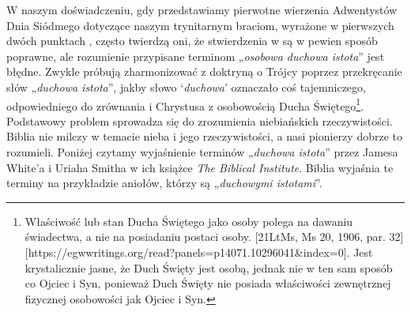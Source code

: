 W naszym doświadczeniu, gdy przedstawiamy pierwotne wierzenia Adwentystów Dnia Siódmego dotyczące  naszym trynitarnym braciom, wyrażone w pierwszych dwóch punktach , często twierdzą oni, że stwierdzenia w  są w pewien sposób poprawne, ale rozumienie przypisane terminom „\textit{osobowa duchowa istota}” jest błędne. Zwykle próbują zharmonizować  z doktryną o Trójcy poprzez przekręcanie słów „\textit{duchowa istota}”, jakby słowo ‘\textit{duchowa}’ oznaczało coś tajemniczego, odpowiedniego do zrównania  i Chrystusa z osobowością Ducha Świętego\footnote{Właściwość lub stan Ducha Świętego jako osoby polega na dawaniu świadectwa, a nie na posiadaniu postaci osoby. [21LtMs, Ms 20, 1906, par. 32][https://egwwritings.org/read?panels=p14071.10296041&index=0]. Jest krystalicznie jasne, że Duch Święty jest osobą, jednak nie w ten sam sposób co Ojciec i Syn, ponieważ Duch Święty nie posiada właściwości zewnętrznej fizycznej osobowości jak Ojciec i Syn.}. Podstawowy problem sprowadza się do zrozumienia niebiańskich rzeczywistości. Biblia nie milczy w temacie nieba i jego rzeczywistości, a nasi pionierzy dobrze to rozumieli. Poniżej czytamy wyjaśnienie terminów „\textit{duchowa istota}” przez Jamesa White'a i Uriaha Smitha w ich książce \textit{The Biblical Institute}. Biblia wyjaśnia te terminy na przykładzie aniołów, którzy są „\textit{duchowymi istotami}”.

